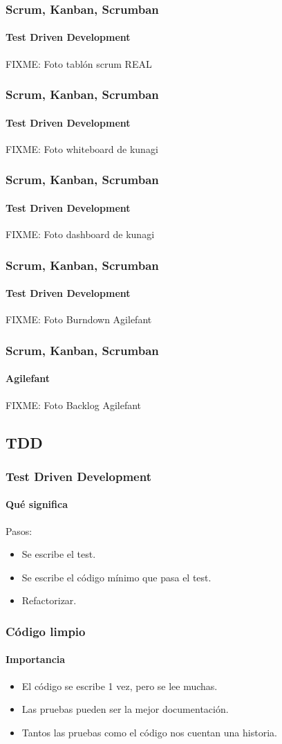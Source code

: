 \begin{frame}
  \frametitle{Scrum, Kanban, Scrumban}
  \framesubtitle{Test Driven Development}

  FIXME: Foto tablón scrum REAL

\end{frame}

\begin{frame}
  \frametitle{Scrum, Kanban, Scrumban}
  \framesubtitle{Test Driven Development}

  FIXME: Foto whiteboard de kunagi

\end{frame}

\begin{frame}
  \frametitle{Scrum, Kanban, Scrumban}
  \framesubtitle{Test Driven Development}

  FIXME: Foto dashboard de kunagi

\end{frame}

\begin{frame}
  \frametitle{Scrum, Kanban, Scrumban}
  \framesubtitle{Test Driven Development}

  FIXME: Foto Burndown Agilefant

\end{frame}

\begin{frame}
  \frametitle{Scrum, Kanban, Scrumban}
  \framesubtitle{Agilefant}

  FIXME: Foto Backlog Agilefant

\end{frame}

\subsection{TDD}

\begin{frame}
  \frametitle{Test Driven Development}
  \framesubtitle{Qué significa}

  Pasos:
  \begin{itemize}
  \item Se escribe el test.
  \item Se escribe el código mínimo que pasa el test.
  \item Refactorizar.
  \end{itemize}
\end{frame}


\begin{frame}
  \frametitle{Código limpio}
  \framesubtitle{Importancia}

  \begin{itemize}
  \item El código se escribe 1 vez, pero se lee muchas.
  \item Las pruebas pueden ser la mejor documentación.
  \item Tantos las pruebas como el código nos cuentan una historia.
  \end{itemize}
\end{frame}


